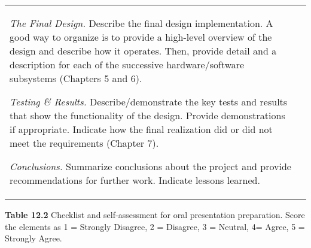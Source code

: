\begin{longtable}[]{@{}
  >{\raggedright\arraybackslash}p{}
  >{\raggedright\arraybackslash}p{}@{}}
\emph{The Final Design.} Describe the final design implementation. A
good way to organize is to provide a high-level overview of the design
and describe how it operates. Then, provide detail and a description for
each of the successive hardware/software subsystems (Chapters 5 and 6).

\emph{Testing \& Results.} Describe/demonstrate the key tests and
results that show the functionality of the design. Provide
demonstrations if appropriate. Indicate how the final realization did or
did not meet the requirements (Chapter 7).

\emph{Conclusions.} Summarize conclusions about the project and provide
recommendations for further work. Indicate lessons learned. \\
\end{longtable}

\textbf{\hfill\break
Table 12.2} Checklist and self-assessment for oral presentation
preparation. Score the elements as 1 = Strongly Disagree, 2 = Disagree,
3 = Neutral, 4= Agree, 5 = Strongly Agree.

